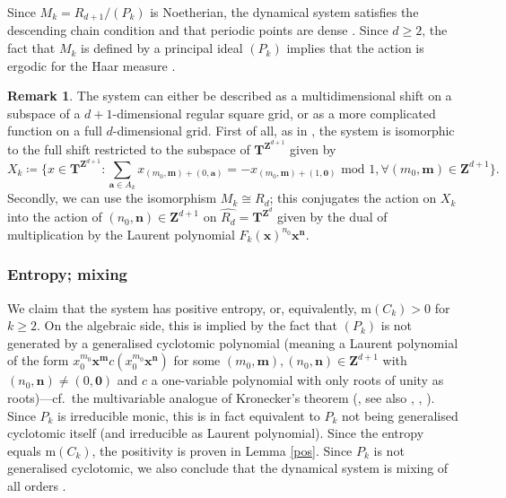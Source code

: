 \documentclass[12pt,reqno]{amsart}
\theoremstyle{definition}
\theoremstyle{plain}
\theoremstyle{definition}
\newtheorem{remark}[theorem]{Remark}
\newcommand{\Z}{\mathbf{Z}}
\newcommand{\T}{\mathbf{T}}
\newcommand\m{\mathrm{m}}
\renewcommand{\geq}{\geqslant}
\begin{document}
Since $M_k = R_{d+1}/(P_k)$ is Noetherian, the dynamical system satisfies the descending chain condition and that periodic points are dense \cite[5.4 \& 5.7]{Schmidt}. Since $d \geq 2$, the fact that $M_k$ is defined by a principal ideal $(P_k)$ implies that the action is ergodic for the Haar measure \cite[6.11]{Schmidt}. 

\begin{remark} 
The system can either be described as a multidimensional shift on a subspace of a $d+1$-dimensional regular square grid, or as a more complicated function on a full $d$-dimensional grid. First of all, as in \cite[5.2(2)]{Schmidt}, the system is isomorphic to the full shift restricted to the subspace of $\T^{\Z^{d+1}}$ given by 
$$ X_k \coloneqq  \{ x \in \T^{\Z^{d+1}} \colon \sum_{ \mathbf a \in A_k} x_{(m_0,\mathbf m)+(0,\mathbf a)} = - x_{(m_0,\mathbf m)+(1,\mathbf 0)} \mbox{ mod } 1, \forall (m_0,\mathbf m) \in \Z^{d+1} \}. $$ Secondly, we can use the isomorphism $M_k \cong R_d$; this conjugates the action on $X_k$ into the action of $ (n_0,\mathbf n) \in \Z^{d+1}$ on $\widehat{R_d} = \T^{\Z^d}$ given by the dual of multiplication by the Laurent polynomial $F_k(\mathbf x)^{n_0} \mathbf x^{\mathbf n}$. 
\end{remark}

\subsubsection*{Entropy; mixing} We claim that the system has positive entropy, or, equivalently, $\m(C_k)>0$ for $k \geq 2$. On the algebraic side, this is implied by the fact that $(P_k)$ is not generated by a generalised cyclotomic polynomial (meaning a Laurent polynomial of the form $x_0^{m_0} \mathbf{x}^{\mathbf{m}} c(x_0^{m_0} \mathbf{x}^{\mathbf{n}})$ for some $(m_0,\mathbf{m}), (n_0, \mathbf{n}) \in \Z^{d+1}$ with $(n_0, \mathbf{n}) \neq (0,\mathbf{0})$ and $c$ a one-variable polynomial with only roots of unity as roots)---cf.\ the multivariable analogue of Kronecker's theorem (\cite[19.5]{Schmidt}, see also \cite{BoydKronecker}, \cite{SmythKronecker}, \cite{LawtonKronecker}). Since $P_k$ is irreducible monic, this is in fact equivalent to $P_k$ not being generalised cyclotomic itself (and irreducible as Laurent polynomial). Since the entropy equals $\m(C_k)$, the positivity is proven in Lemma \ref{pos}. 
Since $P_k$ is not generalised cyclotomic, we also conclude that the dynamical system is mixing of all orders \cite[6.12 \& 27.2]{Schmidt}. 
\end{document}
